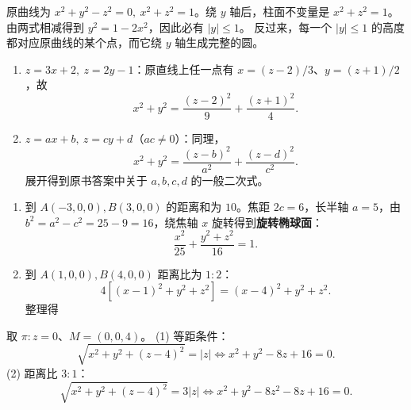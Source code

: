 原曲线为 $x^2+y^2-z^2=0,\ x^2+z^2=1$。绕 $y$ 轴后，柱面不变量是 $x^2+z^2=1$。由两式相减得到 $y^2=1-2x^2$，因此必有 $|y|\le1$。
反过来，每一个 $|y|\le1$ 的高度都对应原曲线的某个点，而它绕 $y$ 轴生成完整的圆。

\begin{enumerate}[label=(\arabic*)]
\item $z=3x+2,\ z=2y-1$：原直线上任一点有 $x=(z-2)/3$、$y=(z+1)/2$，故
\[x^2+y^2=\frac{(z-2)^2}{9}+\frac{(z+1)^2}{4}.\]
\item $z=ax+b,\ z=cy+d$（$ac\ne0$）：同理，
\[\boxed{x^2+y^2=\frac{(z-b)^2}{a^2}+\frac{(z-d)^2}{c^2}}.\]
展开得到原书答案中关于 $a,b,c,d$ 的一般二次式。
\end{enumerate}

\begin{enumerate}[label=(\arabic*)]
\item 到 $A(-3,0,0),B(3,0,0)$ 的距离和为 $10$。焦距 $2c=6$，长半轴 $a=5$，由 $b^2=a^2-c^2=25-9=16$，绕焦轴 $x$ 旋转得到\textbf{旋转椭球面}：
\[\boxed{\frac{x^2}{25}+\frac{y^2+z^2}{16}=1}.\]
\item 到 $A(1,0,0),B(4,0,0)$ 距离比为 $1:2$：
\[4[(x-1)^2+y^2+z^2]=(x-4)^2+y^2+z^2.\]
整理得
\end{enumerate}

取 $\pi:z=0$、$M=(0,0,4)$。
(1) 等距条件：
\[\sqrt{x^2+y^2+(z-4)^2}=|z| \iff x^2+y^2-8z+16=0.\]
(2) 距离比 $3:1$：
\[\sqrt{x^2+y^2+(z-4)^2}=3|z|\iff x^2+y^2-8z^2-8z+16=0.\]

